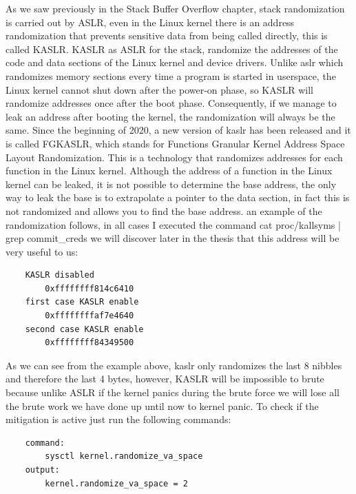     As we saw previously in the Stack Buffer Overflow chapter, stack randomization is carried out by ASLR, even in the Linux kernel there is an address randomization that prevents sensitive data from being called directly, this is called KASLR. \newline
    KASLR as ASLR for the stack, randomize the addresses of the code and data sections of the Linux kernel and device drivers.\newline
    Unlike aslr which randomizes memory sections every time a program is started in userspace, the Linux kernel cannot shut down after the power-on phase, so KASLR will randomize addresses once after the boot phase.\newline
    Consequently, if we manage to leak an address after booting the kernel, the randomization will always be the same.\newline
    Since the beginning of 2020, a new version of kaslr has been released and it is called FGKASLR, which stands for Functions Granular Kernel Address Space Layout Randomization.\newline 
    This is a technology that randomizes addresses for each function in the Linux kernel.\newline 
    Although the address of a function in the Linux kernel can be leaked, it is not possible to determine the base address, the only way to leak the base is to extrapolate a pointer to the data section, in fact this is not randomized and allows you to find the base address.\newline
    an example of the randomization follows, in all cases I executed the command cat proc/kallsyms | grep commit\_creds we will discover later in the thesis that this address will be very useful to us:\newline
    \begin{verbatim}
    KASLR disabled 
        0xffffffff814c6410
    first case KASLR enable  
        0xffffffffaf7e4640
    second case KASLR enable
        0xffffffff84349500
    \end{verbatim}
    As we can see from the example above, kaslr only randomizes the last 8 nibbles and therefore the last 4 bytes, however, KASLR will be impossible to brute because unlike ASLR if the kernel panics during the brute force we will lose all the brute work we have done up until now to kernel panic.\newline
    To check if the mitigation is active just run the following commands: \newline
    \begin{verbatim}
    command:
        sysctl kernel.randomize_va_space                  
    output:
        kernel.randomize_va_space = 2

    \end{verbatim}
    \clearpage
